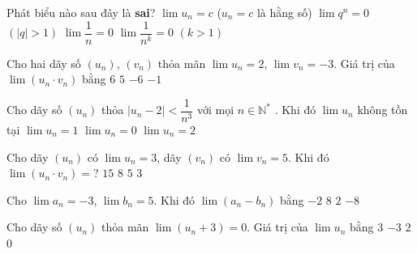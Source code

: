 \begin{ex}%
	Phát biểu  nào sau đây là \textbf{sai}?
	\choice 
		{$\lim{u_n}=c$ ($u_n=c$ là hằng  số)}
		{\True $\lim{q^n}=0$ $\left(\left| q\right|>1\right)$} 
		 {$\lim\dfrac{1}{n}=0$}
		{$\lim\dfrac{1}{n^k}=0$ $\left(k>1\right)$} 
\end{ex}

\begin{ex}%
	Cho hai dãy số $\left(u_n\right)$, $\left(v_n\right)$ thỏa mãn $\lim u_n=2$, $\lim v_n=-3$.  Giá trị của $\lim\left(u_n \cdot v_n\right)$ bằng
	 \choice
		 {$6$}
		 {$5$}
		{\True  $-6$}
		 {$-1$}
\end{ex}

\begin{ex}%
	Cho dãy số $\left(u_n\right)$ thỏa $\left|u_n-2\right|<\dfrac{1}{n^3}$ với mọi  $n\in\mathbb{N}^*$ . Khi đó
	 \choice
		{$\lim{u_n}$ không tồn tại} 
		{$\lim{u_n}=1$} 
		 {$\lim{u_n}=0$}
		 {\True $\lim{u_n}=2$}
\end{ex}

\begin{ex}%
	Cho dãy $(u_n)$ có $\lim u_n=3$, dãy $(v_n)$ có $\lim v_n=5$. Khi đó  $\lim\left(u_n\cdot v_n\right)=$?
	 \choice
		 {\True $15$}
		 {$8$}
		 {$5$}
		 {$3$}
\end{ex}

\begin{ex}%
	Cho $\lim a_n=-3$, $\lim b_n=5$. Khi đó  $\lim\left(a_n-b_n\right)$ bằng
	\choice 
		{$-2$} 
		{$8$} 
		 {$2$}
		{\True $-8$} 
\end{ex}

\begin{ex}%
	Cho dãy số $\left(u_n\right)$ thỏa mãn  $\lim\left(u_n+3\right)=0$. Giá trị của $\lim u_n$ bằng
	 \choice
		{$3$} 
		{\True $-3$} 
		 {$2$}
		 {$0$}
\end{ex}

